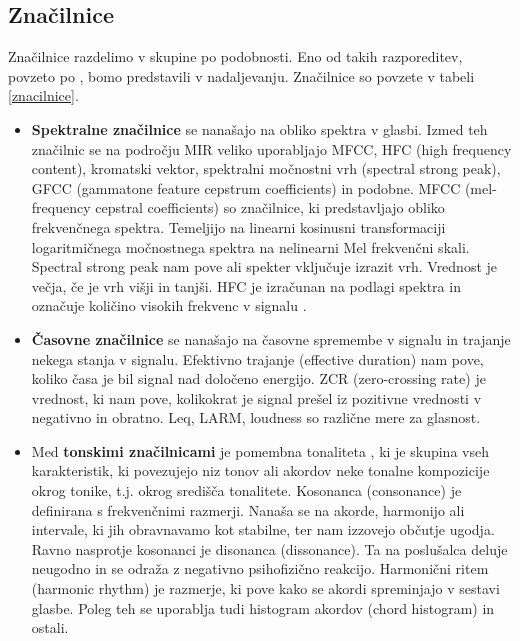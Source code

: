 \documentclass[a4paper, 12pt]{book}
\begin{document}
{\subsection{Značilnice}

Značilnice razdelimo v skupine po podobnosti. Eno od takih razporeditev, povzeto po \cite{laurier2007audio, bogdanov2013form}, bomo predstavili v nadaljevanju. Značilnice so povzete v tabeli \ref{znacilnice}.

\begin{itemize}

  \item \textbf{Spektralne značilnice} se nanašajo na obliko spektra v glasbi. Izmed teh značilnic se na področju MIR veliko uporabljajo MFCC, HFC (high frequency content), kromatski vektor, spektralni močnostni vrh (spectral strong peak), GFCC (gammatone feature cepstrum coefficients) in podobne. 
MFCC (mel-frequency cepstral coefficients) \cite{lawrence2008fundamentals} so značilnice, ki predstavljajo obliko frekvenčnega spektra. Temeljijo na linearni kosinusni transformaciji logaritmičnega močnostnega spektra na nelinearni Mel frekvenčni skali. Spectral strong peak \cite{gouyon2001exploration} nam pove ali spekter vključuje izrazit vrh. Vrednost je večja, če je vrh višji in tanjši. HFC je izračunan na podlagi spektra in označuje količino visokih frekvenc v signalu \cite{brossier2004real}.

  \item \textbf{Časovne značilnice} se nanašajo na časovne spremembe v signalu in trajanje nekega stanja v signalu. Efektivno trajanje (effective duration) nam pove, koliko časa je bil signal nad določeno energijo. ZCR (zero-crossing rate) \cite{gouyon2000classifying} je vrednost, ki nam pove, kolikokrat je signal prešel iz pozitivne vrednosti v negativno in obratno. Leq, LARM, loudness so različne mere za glasnost. 
  
  \item Med \textbf{tonskimi značilnicami} je pomembna tonaliteta \cite{zhu2005music}, ki je skupina vseh karakteristik, ki povezujejo niz tonov ali akordov neke tonalne kompozicije okrog tonike, t.j. okrog središča tonalitete. Kosonanca  (consonance) \cite{terhardt1974pitch} je definirana s frekvenčnimi razmerji. Nanaša se na akorde, harmonijo ali intervale, ki jih obravnavamo kot stabilne, ter nam izzovejo občutje ugodja. Ravno nasprotje kosonanci je disonanca (dissonance). Ta na poslušalca deluje neugodno in se odraža z negativno psihofizično reakcijo. Harmonični ritem (harmonic rhythm) \cite{la2001harmonic} je razmerje, ki pove kako se akordi spreminjajo v sestavi glasbe. Poleg teh se uporablja tudi histogram akordov (chord histogram) in ostali.
  

\end{itemize}}
\end{document}
